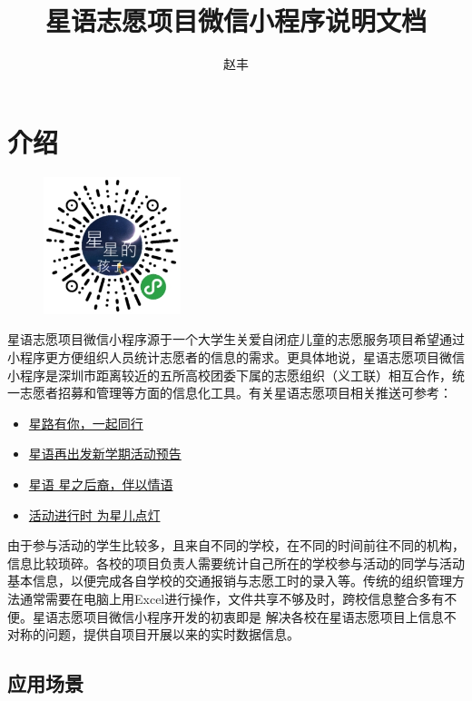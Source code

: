 \documentclass[]{ctexart}
\title{星语志愿项目微信小程序说明文档}
\author{赵丰}
\begin{document}
\maketitle
\tableofcontents
\section{介绍}\label{ux4ecbux7ecd}
\begin{figure}
\centering
\includegraphics[width=4cm]{assets/qr_code.jpg}
\end{figure}
星语志愿项目微信小程序源于一个大学生关爱自闭症儿童的志愿服务项目希望通过小程序更方便组织人员统计志愿者的信息的需求。更具体地说，星语志愿项目微信小程序是深圳市距离较近的五所高校团委下属的志愿组织（义工联）相互合作，统一志愿者招募和管理等方面的信息化工具。有关星语志愿项目相关推送可参考：

\begin{itemize}
\item
  \href{https://mp.weixin.qq.com/s/byIknsUz62tn1YJlp10byQ}{星路有你，一起同行}
\item
  \href{https://mp.weixin.qq.com/s/hSAWZha7Tkq2MzG_uOD06Q}{星语再出发\textbar{}新学期活动预告}
\item
  \href{https://mp.weixin.qq.com/s/VM50R464I1mo3E6GOoEZew}{星语
  \textbar{} 星之后裔，伴以情语}
\item
  \href{https://mp.weixin.qq.com/s/RyINo_CrGJZAUaHekhHcPg}{活动进行时
  \textbar{} 为星儿点灯}
\end{itemize}

由于参与活动的学生比较多，且来自不同的学校，在不同的时间前往不同的机构，信息比较琐碎。各校的项目负责人需要统计自己所在的学校参与活动的同学与活动基本信息，以便完成各自学校的交通报销与志愿工时的录入等。传统的组织管理方法通常需要在电脑上用Excel进行操作，文件共享不够及时，跨校信息整合多有不便。星语志愿项目微信小程序开发的初衷即是
解决各校在星语志愿项目上信息不对称的问题，提供自项目开展以来的实时数据信息。

\subsection{应用场景}\label{ux5e94ux7528ux573aux666f}
\end{document}
